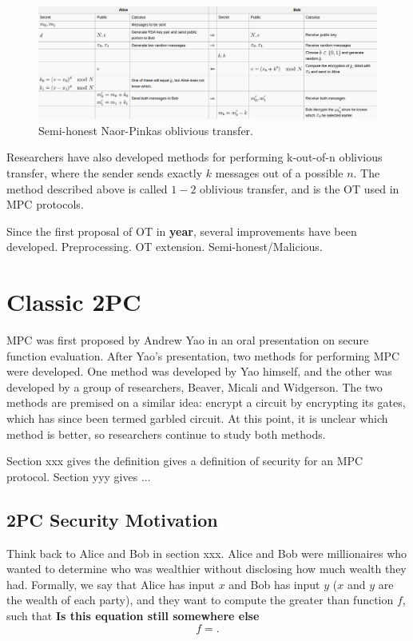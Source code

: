 \begin{figure}
    \centering
    \includegraphics[scale=0.3]{images/ot_wiki}
    \caption{Semi-honest Naor-Pinkas oblivious transfer.}
\end{figure}

Researchers have also developed methods for performing k-out-of-n oblivious transfer, where the sender sends exactly $k$ messages out of a possible $n$.
The method described above is called $1-2$ oblivious transfer, and is the OT used in MPC protocols.

Since the first proposal of OT in \textbf{year}, several improvements have been developed.
Preprocessing.
OT extension.
Semi-honest/Malicious.

\section{Classic 2PC}
MPC was first proposed by Andrew Yao in an oral presentation on secure function evaluation.
After Yao's presentation, two methods for performing MPC were developed.
One method was developed by Yao himself, and the other was developed by a group of researchers, Beaver, Micali and Widgerson.
The two methods are premised on a similar idea: encrypt a circuit by encrypting its gates, which has since been termed garbled circuit.
At this point, it is unclear which method is better, so researchers continue to study both methods.

Section xxx gives the definition gives a definition of security for an MPC protocol. 
Section yyy gives ...

\subsection{2PC Security Motivation}
Think back to Alice and Bob in section xxx. 
Alice and Bob were millionaires who wanted to determine who was wealthier without disclosing how much wealth they had.
Formally, we say that Alice has input $x$ and Bob has input $y$ ($x$ and $y$ are the wealth of each party), and they want to compute the greater than function $f$, such that 
\textbf{Is this equation still somewhere else}
\begin{equation}
    f = .
\end{equation}

